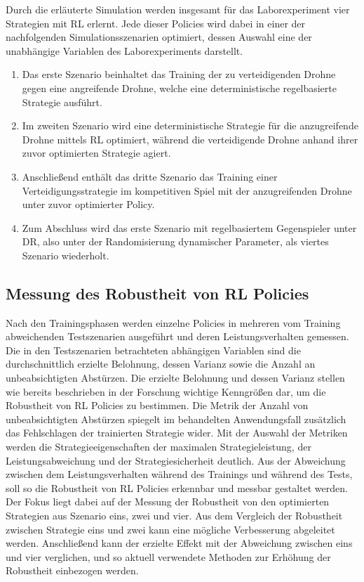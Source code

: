 Durch die erläuterte Simulation werden insgesamt für das Laborexperiment vier Strategien mit RL erlernt.
Jede dieser Policies wird dabei in einer der nachfolgenden Simulationsszenarien optimiert, dessen Auswahl eine der unabhängige Variablen des Laborexperiments darstellt.
\begin{enumerate}
    \item Das erste Szenario beinhaltet das Training der zu verteidigenden Drohne gegen eine angreifende Drohne, welche eine deterministische regelbasierte Strategie ausführt.
    \item Im zweiten Szenario wird eine deterministische Strategie für die anzugreifende Drohne mittels RL optimiert, während die verteidigende Drohne anhand ihrer zuvor optimierten Strategie agiert.
    \item Anschließend enthält das dritte Szenario das Training einer Verteidigungsstrategie im kompetitiven Spiel mit der anzugreifenden Drohne unter zuvor optimierter Policy.
    \item Zum Abschluss wird das erste Szenario mit regelbasiertem Gegenspieler unter DR, also unter der Randomisierung dynamischer Parameter, als viertes Szenario wiederholt. 
\end{enumerate}

\subsection{Messung des Robustheit von RL Policies}

Nach den Trainingsphasen werden einzelne Policies in mehreren vom Training abweichenden Testszenarien ausgeführt und deren Leistungsverhalten gemessen.
Die in den Testszenarien betrachteten abhängigen Variablen sind die durchschnittlich erzielte Belohnung, dessen Varianz sowie die Anzahl an unbeabsichtigten Abstürzen.
Die erzielte Belohnung und dessen Varianz stellen wie bereits beschrieben in der Forschung wichtige Kenngrößen dar, um die Robustheit von RL Policies zu bestimmen.
Die Metrik der Anzahl von unbeabsichtigten Abstürzen spiegelt im behandelten Anwendungsfall zusätzlich das Fehlschlagen der trainierten Strategie wider.
Mit der Auswahl der Metriken werden die Strategieeigenschaften der maximalen Strategieleistung, der Leistungsabweichung und der Strategiesicherheit deutlich.
Aus der Abweichung zwischen dem Leistungsverhalten während des Trainings und während des Tests, soll so die Robustheit von RL Policies erkennbar und messbar gestaltet werden.
Der Fokus liegt dabei auf der Messung der Robustheit von den optimierten Strategien aus Szenario eins, zwei und vier.
Aus dem Vergleich der Robustheit zwischen Strategie eins und zwei kann eine mögliche Verbesserung abgeleitet werden.
Anschließend kann der erzielte Effekt mit der Abweichung zwischen eins und vier verglichen, und so aktuell verwendete Methoden zur Erhöhung der Robustheit einbezogen werden.

